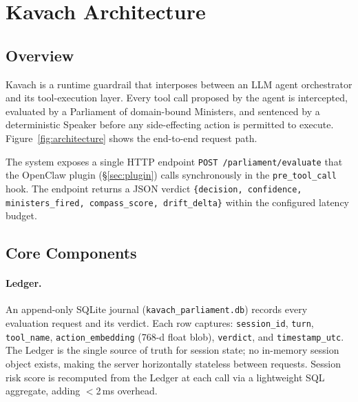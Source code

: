 
\section{Kavach Architecture}
\label{sec:design}

\subsection{Overview}

Kavach is a runtime guardrail that interposes between an LLM agent orchestrator
and its tool-execution layer. Every tool call proposed by the agent is
intercepted, evaluated by a Parliament of domain-bound Ministers, and sentenced
by a deterministic Speaker before any side-effecting action is permitted to
execute. Figure~\ref{fig:architecture} shows the end-to-end request path.

The system exposes a single HTTP endpoint \texttt{POST /parliament/evaluate}
that the OpenClaw plugin (\S\ref{sec:plugin}) calls synchronously in the
\texttt{pre\_tool\_call} hook. The endpoint returns a JSON verdict
\texttt{\{decision, confidence, ministers\_fired, compass\_score,
drift\_delta\}} within the configured latency budget.

\subsection{Core Components}

\paragraph{Ledger.}
An append-only SQLite journal (\texttt{kavach\_parliament.db}) records every
evaluation request and its verdict. Each row captures:
\texttt{session\_id}, \texttt{turn}, \texttt{tool\_name}, \texttt{action\_embedding}
(768-d float blob), \texttt{verdict}, and \texttt{timestamp\_utc}.
The Ledger is the single source of truth for session state; no in-memory
session object exists, making the server horizontally stateless between
requests. Session risk score is recomputed from the Ledger at each call via
a lightweight SQL aggregate, adding $<$2\,ms overhead.

